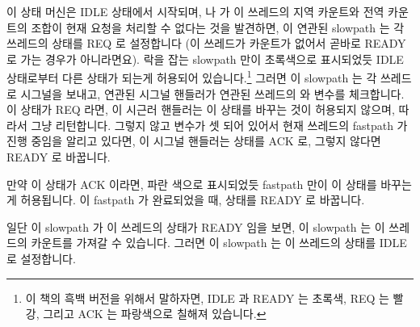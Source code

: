 이 상태 머신은 IDLE 상태에서 시작되며,  나  가
이 쓰레드의 지역 카운트와 전역 카운트의 조합이 현재 요청을 처리할 수 없다는
것을 발견하면, 이 연관된 slowpath 는 각 쓰레드의  상태를 REQ 로
설정합니다 (이 쓰레드가 카운트가 없어서 곧바로 READY 로 가는 경우가
아니라면요).
 락을 잡는 slowpath 만이 초록색으로 표시되었듯 IDLE 상태로부터
다른 상태가 되는게 허용되어 있습니다.\footnote{
	이 책의 흑백 버전을 위해서 말하자면, IDLE 과 READY 는 초록색, REQ 는
	빨강, 그리고 ACK 는 파랑색으로 칠해져 있습니다.}
그러면 이 slowpath 는 각 쓰레드로 시그널을 보내고, 연관된 시그널 핸들러가
연관된 쓰레드의  와  변수를 체크합니다.
이  상태가 REQ 라면, 이 시근러 핸들러는 이 상태를 바꾸는 것이
허용되지 않으며, 따라서 그냥 리턴합니다.
그렇지 않고  변수가 셋 되어 있어서 현재 쓰레드의 fastpath 가 진행
중임을 알리고 있다면, 이 시그널 핸들러는  상태를 ACK 로, 그렇지
않다면 READY 로 바꿉니다.

만약 이  상태가 ACK 이라면, 파란 색으로 표시되었듯 fastpath 만이 이
 상태를 바꾸는 게 허용됩니다.
이 fastpath 가 완료되었을 때,  상태를 READY 로 바꿉니다.

일단 이 slowpath 가 이 쓰레드의  상태가 READY 임을 보면, 이 slowpath
는 이 쓰레드의 카운트를 가져갈 수 있습니다.
그러면 이 slowpath 는 이 쓰레드의  상태를 IDLE 로 설정합니다.

